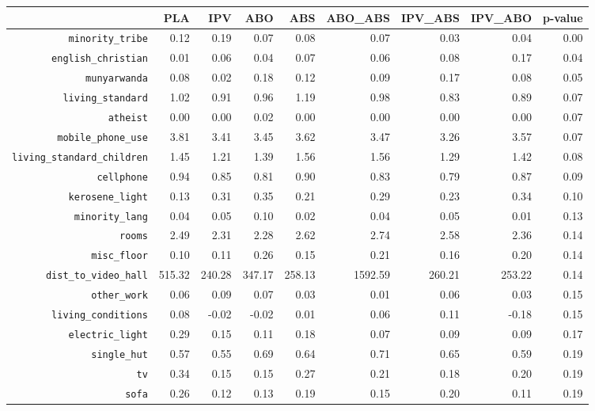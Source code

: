 \begin{longtable}{rrrrrrrrr}
  \hline
 & PLA & IPV & ABO & ABS & ABO\_ABS & IPV\_ABS & IPV\_ABO & p-value \\ 
  \hline
{\texttt{minority\_tribe}} & 0.12 & 0.19 & 0.07 & 0.08 & 0.07 & 0.03 & 0.04 & 0.00 \\ 
  {\texttt{english\_christian}} & 0.01 & 0.06 & 0.04 & 0.07 & 0.06 & 0.08 & 0.17 & 0.04 \\ 
  {\texttt{munyarwanda}} & 0.08 & 0.02 & 0.18 & 0.12 & 0.09 & 0.17 & 0.08 & 0.05 \\ 
  {\texttt{living\_standard}} & 1.02 & 0.91 & 0.96 & 1.19 & 0.98 & 0.83 & 0.89 & 0.07 \\ 
  {\texttt{atheist}} & 0.00 & 0.00 & 0.02 & 0.00 & 0.00 & 0.00 & 0.00 & 0.07 \\ 
  {\texttt{mobile\_phone\_use}} & 3.81 & 3.41 & 3.45 & 3.62 & 3.47 & 3.26 & 3.57 & 0.07 \\ 
  {\texttt{living\_standard\_children}} & 1.45 & 1.21 & 1.39 & 1.56 & 1.56 & 1.29 & 1.42 & 0.08 \\ 
  {\texttt{cellphone}} & 0.94 & 0.85 & 0.81 & 0.90 & 0.83 & 0.79 & 0.87 & 0.09 \\ 
  {\texttt{kerosene\_light}} & 0.13 & 0.31 & 0.35 & 0.21 & 0.29 & 0.23 & 0.34 & 0.10 \\ 
  {\texttt{minority\_lang}} & 0.04 & 0.05 & 0.10 & 0.02 & 0.04 & 0.05 & 0.01 & 0.13 \\ 
  {\texttt{rooms}} & 2.49 & 2.31 & 2.28 & 2.62 & 2.74 & 2.58 & 2.36 & 0.14 \\ 
  {\texttt{misc\_floor}} & 0.10 & 0.11 & 0.26 & 0.15 & 0.21 & 0.16 & 0.20 & 0.14 \\ 
  {\texttt{dist\_to\_video\_hall}} & 515.32 & 240.28 & 347.17 & 258.13 & 1592.59 & 260.21 & 253.22 & 0.14 \\ 
  {\texttt{other\_work}} & 0.06 & 0.09 & 0.07 & 0.03 & 0.01 & 0.06 & 0.03 & 0.15 \\ 
  {\texttt{living\_conditions}} & 0.08 & -0.02 & -0.02 & 0.01 & 0.06 & 0.11 & -0.18 & 0.15 \\ 
  {\texttt{electric\_light}} & 0.29 & 0.15 & 0.11 & 0.18 & 0.07 & 0.09 & 0.09 & 0.17 \\ 
  {\texttt{single\_hut}} & 0.57 & 0.55 & 0.69 & 0.64 & 0.71 & 0.65 & 0.59 & 0.19 \\ 
  {\texttt{tv}} & 0.34 & 0.15 & 0.15 & 0.27 & 0.21 & 0.18 & 0.20 & 0.19 \\ 
  {\texttt{sofa}} & 0.26 & 0.12 & 0.13 & 0.19 & 0.15 & 0.20 & 0.11 & 0.19 \\ 

\end{longtable}
